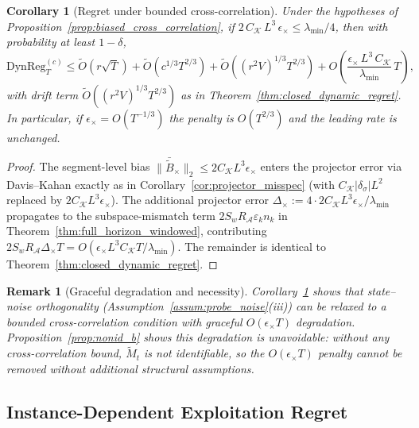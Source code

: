 \documentclass[11pt]{article}
\newcommand{\cA}{\mathcal{A}}
\newcommand{\DynReg}{\mathrm{DynReg}}
\newtheorem{corollary}{Corollary}
\newtheorem{remark}{Remark}
\begin{document}
\begin{corollary}[Regret under bounded cross-correlation]
\label{cor:regret_cross_correlation}
Under the hypotheses of Proposition~\ref{prop:biased_cross_correlation},
if $2\,C_{\mathcal{K}}\,L^3\,\epsilon_\times\le\lambda_{\min}/4$, then
with probability at least $1-\delta$,
\[
\DynReg_T^{(c)}
\le\widetilde{O}(r\sqrt{T})+\widetilde{O}(c^{1/3}T^{2/3})+\widetilde{O}((r^2V)^{1/3}T^{2/3})
+O\!\left(\frac{\epsilon_\times\,L^3\,C_{\mathcal{K}}}{\lambda_{\min}}\,T\right),
\]
with drift term $\widetilde O((r^2V)^{1/3}T^{2/3})$ as in
Theorem~\ref{thm:closed_dynamic_regret}.
In particular, if $\epsilon_\times=O(T^{-1/3})$ the penalty is $O(T^{2/3})$
and the leading rate is unchanged.
\end{corollary}

\begin{proof}
The segment-level bias
$\|\bar{\widetilde{B}}_\times\|_2\le 2C_{\mathcal{K}}L^3\epsilon_\times$
enters the projector error via Davis--Kahan exactly as in
Corollary~\ref{cor:projector_misspec}
(with $C_{\mathcal{K}}|\delta_\sigma|L^2$ replaced by
$2C_{\mathcal{K}}L^3\epsilon_\times$).
The additional projector error
$\Delta_\times:=4\cdot 2C_{\mathcal{K}}L^3\epsilon_\times/\lambda_{\min}$
propagates to the subspace-mismatch term $2S_wR_{\cA}\varepsilon_kn_k$ in
Theorem~\ref{thm:full_horizon_windowed}, contributing
$2S_wR_{\cA}\Delta_\times T = O(\epsilon_\times L^3C_{\mathcal{K}}T/\lambda_{\min})$.
The remainder is identical to Theorem~\ref{thm:closed_dynamic_regret}.
\end{proof}

\begin{remark}[Graceful degradation and necessity]
\label{rem:cross_correlation_discussion}
Corollary~\ref{cor:regret_cross_correlation} shows that state--noise
orthogonality (Assumption~\ref{assum:probe_noise}(iii)) can be relaxed to a
bounded cross-correlation condition with graceful $O(\epsilon_\times T)$
degradation.
Proposition~\ref{prop:nonid_b} shows this degradation is unavoidable:
without any cross-correlation bound, $\widetilde{M}_t$ is not identifiable,
so the $O(\epsilon_\times T)$ penalty cannot be removed without
additional structural assumptions.
\end{remark}

\subsection{Instance-Dependent Exploitation Regret}
\label{sec:gap_dependent}
\end{document}
